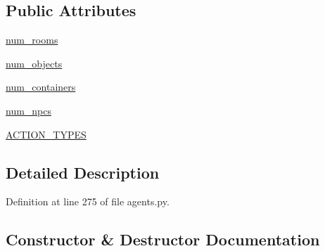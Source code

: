 \subsection*{Public Attributes}
\begin{DoxyCompactItemize}
\item 
\hyperlink{classprojects_1_1mastering__the__dungeon_1_1agents_1_1graph__world2_1_1agents_1_1ObjectChecklistDataAgent_a0a3aeb5a5f0048b2f8af84249d447fa3}{num\+\_\+rooms}
\item 
\hyperlink{classprojects_1_1mastering__the__dungeon_1_1agents_1_1graph__world2_1_1agents_1_1ObjectChecklistDataAgent_ae5e3fbd73e051cb3d9e9f7e71fa113cd}{num\+\_\+objects}
\item 
\hyperlink{classprojects_1_1mastering__the__dungeon_1_1agents_1_1graph__world2_1_1agents_1_1ObjectChecklistDataAgent_ac2d3a47e2eaaae644df824f2206dadf2}{num\+\_\+containers}
\item 
\hyperlink{classprojects_1_1mastering__the__dungeon_1_1agents_1_1graph__world2_1_1agents_1_1ObjectChecklistDataAgent_a5bab15be5226dbff7ad3362f790abf34}{num\+\_\+npcs}
\item 
\hyperlink{classprojects_1_1mastering__the__dungeon_1_1agents_1_1graph__world2_1_1agents_1_1ObjectChecklistDataAgent_aefb8408cc9619ebe73ab7141748c4db8}{A\+C\+T\+I\+O\+N\+\_\+\+T\+Y\+P\+ES}
\end{DoxyCompactItemize}


\subsection{Detailed Description}


Definition at line 275 of file agents.\+py.



\subsection{Constructor \& Destructor Documentation}
\mbox{\label{classprojects_1_1mastering__the__dungeon_1_1agents_1_1graph__world2_1_1agents_1_1ObjectChecklistDataAgent_a1984c21c4618f0404d9f69f399ef7fd3}} 

